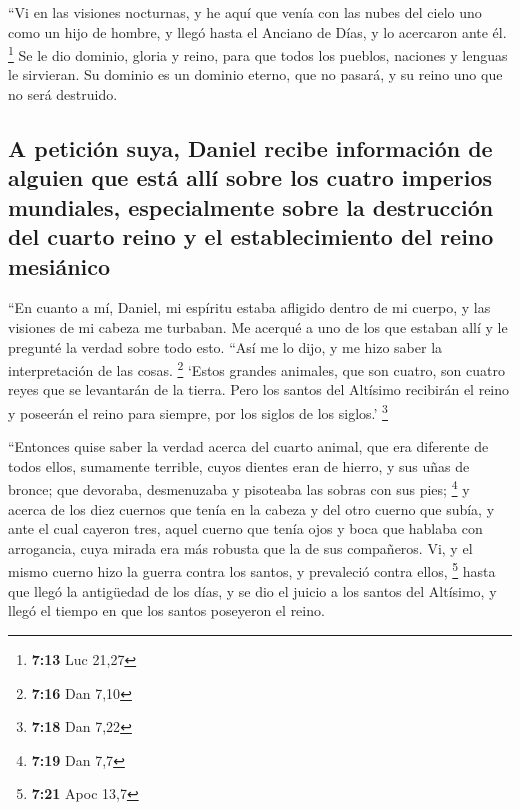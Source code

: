 \begin{paracol}{2}
 ``Vi en las visiones nocturnas, y he aquí que venía con
las nubes del cielo uno como un hijo de hombre, y llegó hasta el Anciano
de Días, y lo acercaron ante él. \footnote{\textbf{7:13} Luc 21,27}
 Se le dio dominio, gloria y reino, para que todos los
pueblos, naciones y lenguas le sirvieran. Su dominio es un dominio
eterno, que no pasará, y su reino uno que no será destruido.

\hypertarget{a-peticiuxf3n-suya-daniel-recibe-informaciuxf3n-de-alguien-que-estuxe1-alluxed-sobre-los-cuatro-imperios-mundiales-especialmente-sobre-la-destrucciuxf3n-del-cuarto-reino-y-el-establecimiento-del-reino-mesiuxe1nico}{%
\subsection{A petición suya, Daniel recibe información de alguien que
está allí sobre los cuatro imperios mundiales, especialmente sobre la
destrucción del cuarto reino y el establecimiento del reino
mesiánico}\label{a-peticiuxf3n-suya-daniel-recibe-informaciuxf3n-de-alguien-que-estuxe1-alluxed-sobre-los-cuatro-imperios-mundiales-especialmente-sobre-la-destrucciuxf3n-del-cuarto-reino-y-el-establecimiento-del-reino-mesiuxe1nico}}

 ``En cuanto a mí, Daniel, mi espíritu estaba afligido
dentro de mi cuerpo, y las visiones de mi cabeza me turbaban.
 Me acerqué a uno de los que estaban allí y le pregunté
la verdad sobre todo esto. ``Así me lo dijo, y me hizo saber la
interpretación de las cosas. \footnote{\textbf{7:16} Dan 7,10}
 `Estos grandes animales, que son cuatro, son cuatro
reyes que se levantarán de la tierra.  Pero los santos
del Altísimo recibirán el reino y poseerán el reino para siempre, por
los siglos de los siglos.' \footnote{\textbf{7:18} Dan 7,22}

 ``Entonces quise saber la verdad acerca del cuarto
animal, que era diferente de todos ellos, sumamente terrible, cuyos
dientes eran de hierro, y sus uñas de bronce; que devoraba, desmenuzaba
y pisoteaba las sobras con sus pies; \footnote{\textbf{7:19} Dan 7,7}
 y acerca de los diez cuernos que tenía en la cabeza y
del otro cuerno que subía, y ante el cual cayeron tres, aquel cuerno que
tenía ojos y boca que hablaba con arrogancia, cuya mirada era más
robusta que la de sus compañeros.  Vi, y el mismo cuerno
hizo la guerra contra los santos, y prevaleció contra ellos, \footnote{\textbf{7:21}
  Apoc 13,7}  hasta que llegó la antigüedad de los días,
y se dio el juicio a los santos del Altísimo, y llegó el tiempo en que
los santos poseyeron el reino.


\end{paracol}
